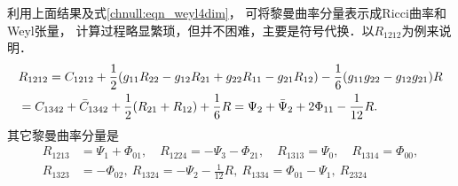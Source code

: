 利用上面结果及式\eqref{chnull:eqn_weyl4dim}，
可将黎曼曲率分量表示成Ricci曲率和Weyl张量，
计算过程略显繁琐，但并不困难，主要是符号代换．以$R_{1212}$为例来说明．
    \begin{align}
        &R_{1212} = C_{1212} + \frac{1}{2}(g_{11}R_{22} - g_{12}R_{21} + g_{22}R_{11} - g_{21}R_{12})
        - \frac{1}{6}(g_{11}g_{22}-g_{12}g_{21}) R    \notag\\
        &=C_{1342} + \bar{C}_{1342}  + \frac{1}{2}(R_{21}  +R_{12})      + \frac{1}{6} R
        = \Psi_{2} + \bar{\Psi}_2 + 2\Phi_{11} -\frac{1}{12}R .
        \label{chnull:eqn_Riemann-by-Weyl-Ricc-R1212}
    \end{align}
其它黎曼曲率分量是
\begin{equation}\label{chnull:eqn_Riemann-by-Weyl-Ricc-all}
    \begin{aligned}
        R_{1213} %
        &= \Psi_{1} + \Phi_{01},      \quad
        R_{1224} %
        = -\Psi_{3} -\Phi_{21} ,  \quad
        R_{1313} %
        = \Psi_{0} ,  \quad
        R_{1314} %
        =  \Phi_{00}, \\
        R_{1323} %
        &= -\Phi_{02}  , \
        R_{1324} %
        = -\Psi_{2} - \frac{1}{12} R  ,   \
        R_{1334} %
        = \Phi_{01}-\Psi_{1}  , \
        R_{2324} %

\end{aligned}
\end{equation}
